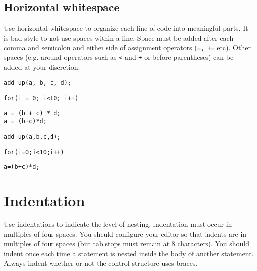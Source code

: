 \documentclass{article}
\begin{document}
\subsection{Horizontal whitespace}
Use horizontal whitespace to organize each line of code into meaningful parts.
It is bad style to not use spaces within a line.
Space must be added after each comma and semicolon and either side of assignment operators (\texttt{=, +=} etc).
Other spaces (e.g. around operators such as \texttt{<} and \texttt{+} or before parentheses) can be added at your discretion.

\begin{multicols}{2}
\begin{lstlisting}
add_up(a, b, c, d);
\end{lstlisting}

\begin{lstlisting}
for(i = 0; i<10; i++)
\end{lstlisting}

\begin{lstlisting}
a = (b + c) * d;
a = (b+c)*d;
\end{lstlisting}
\vfill
\columnbreak

\begin{lstlisting}
add_up(a,b,c,d);
\end{lstlisting}

\begin{lstlisting}
for(i=0;i<10;i++)
\end{lstlisting}

\begin{lstlisting}
a=(b+c)*d;
\end{lstlisting}
\end{multicols}

\clearpage
\section{Indentation}
Use indentations to indicate the level of nesting.
Indentation must occur in multiples of four spaces.
You should configure your editor so that indents are in multiples of four spaces (but tab stops must remain at 8 characters).
You should indent once each time a statement is nested inside the body of another statement.
Always indent whether or not the control structure uses braces.
\end{document}
